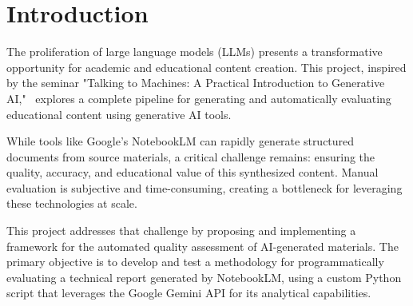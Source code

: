 \section{Introduction}

The proliferation of large language models (LLMs) presents a transformative opportunity for academic and educational content creation. This project, inspired by the seminar "Talking to Machines: A Practical Introduction to Generative AI,"~\cite{sude2025talking} explores a complete pipeline for generating and automatically evaluating educational content using generative AI tools.

While tools like Google's NotebookLM can rapidly generate structured documents from source materials, a critical challenge remains: ensuring the quality, accuracy, and educational value of this synthesized content. Manual evaluation is subjective and time-consuming, creating a bottleneck for leveraging these technologies at scale.

This project addresses that challenge by proposing and implementing a framework for the automated quality assessment of AI-generated materials. The primary objective is to develop and test a methodology for programmatically evaluating a technical report generated by NotebookLM, using a custom Python script that leverages the Google Gemini API for its analytical capabilities.
